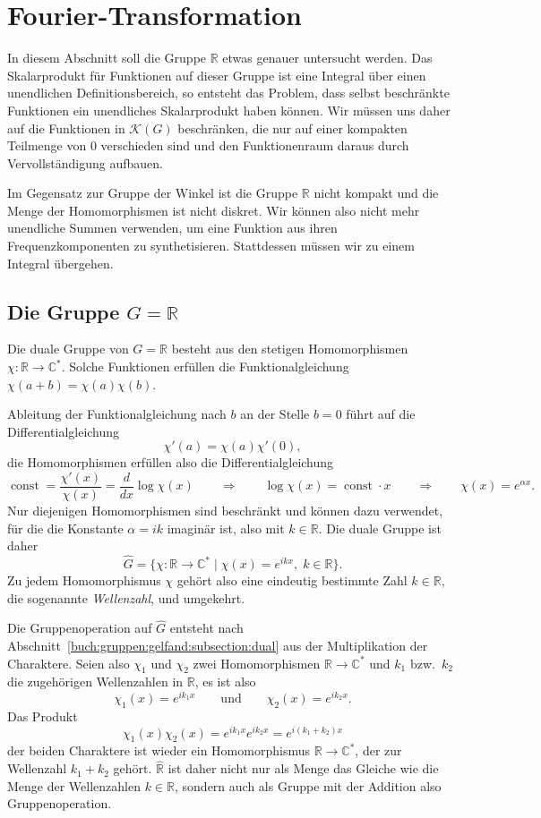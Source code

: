 %
%
%
\section{Fourier-Transformation
\label{buch:gruppen:section:fourier}}
In diesem Abschnitt soll die Gruppe $\mathbb{R}$ etwas genauer untersucht
werden.
Das Skalarprodukt für Funktionen auf dieser Gruppe ist eine Integral über
einen unendlichen Definitionsbereich, so entsteht das Problem, dass
selbst beschränkte Funktionen ein unendliches Skalarprodukt haben können.
Wir müssen uns daher auf die Funktionen in $\mathscr{K}(G)$ beschränken,
die nur auf einer kompakten Teilmenge von $0$ verschieden sind und den
Funktionenraum daraus durch Vervollständigung aufbauen.

Im Gegensatz zur Gruppe der Winkel ist die Gruppe $\mathbb{R}$ nicht kompakt
und die Menge der Homomorphismen ist nicht diskret.
Wir können also nicht mehr unendliche Summen verwenden, um eine Funktion
aus ihren Frequenzkomponenten zu synthetisieren.
Stattdessen müssen wir zu einem Integral übergehen.

%
%
\subsection{Die Gruppe $G=\mathbb{R}$
\label{buch:gruppen:fourier:subsection:gruppeR}}
Die duale Gruppe von $G=\mathbb{R}$ besteht aus den stetigen Homomorphismen
$\chi:\mathbb{R}\to\mathbb{C}^*$.
Solche Funktionen erfüllen die Funktionalgleichung $\chi(a+b)=\chi(a)\chi(b)$.

Ableitung der Funktionalgleichung nach $b$ an der Stelle $b=0$ führt auf
die Differentialgleichung
\[
\chi'(a) = \chi(a)\chi'(0),
\]
die Homomorphismen erfüllen also die Differentialgleichung
\[
\operatorname{const}
=
\frac{\chi'(x)}{\chi(x)} 
=
\frac{d}{dx}\log\chi(x)
\qquad\Rightarrow\qquad
\log\chi(x) = \operatorname{const}\cdot x
\qquad\Rightarrow\qquad
\chi(x) = e^{\alpha x}.
\]
Nur diejenigen Homomorphismen sind beschränkt und können dazu verwendet,
für die die Konstante $\alpha=ik$ imaginär ist, also mit $k\in\mathbb{R}$.
Die duale Gruppe ist daher
\[
\hat{G}
=
\{
\chi\colon\mathbb{R}\to\mathbb{C}^*
\mid
\chi(x) = e^{ikx},\; k\in \mathbb{R}
\}.
\]
Zu jedem Homomorphismus $\chi$ gehört also eine eindeutig bestimmte
Zahl $k\in\mathbb{R}$, die sogenannte {\em Wellenzahl},
%
und umgekehrt.

Die Gruppenoperation auf $\hat{G}$ entsteht nach
Abschnitt~\ref{buch:gruppen:gelfand:subsection:dual} aus der 
Multiplikation der Charaktere.
Seien also $\chi_1$ und $\chi_2$ zwei Homomorphismen
$\mathbb{R}\to\mathbb{C}^*$ und $k_1$ bzw.~$k_2$ die zugehörigen
Wellenzahlen in $\mathbb{R}$, es ist also
\[
\chi_1(x) = e^{ik_1x}
\qquad\text{und}\qquad
\chi_2(x) = e^{ik_2x}.
\]
Das Produkt
\[
\chi_1(x)\chi_2(x)
=
e^{ik_1x}e^{ik_2x}
=
e^{i(k_1+k_2)x}
\]
der beiden Charaktere ist wieder ein Homomorphismus
$\mathbb{R}\to\mathbb{C}^*$, der zur Wellenzahl $k_1+k_2$ gehört.
$\hat{\mathbb{R}}$ ist daher nicht nur als Menge das Gleiche wie
die Menge der Wellenzahlen $k\in \mathbb{R}$, sondern auch als
Gruppe mit der Addition also Gruppenoperation.


